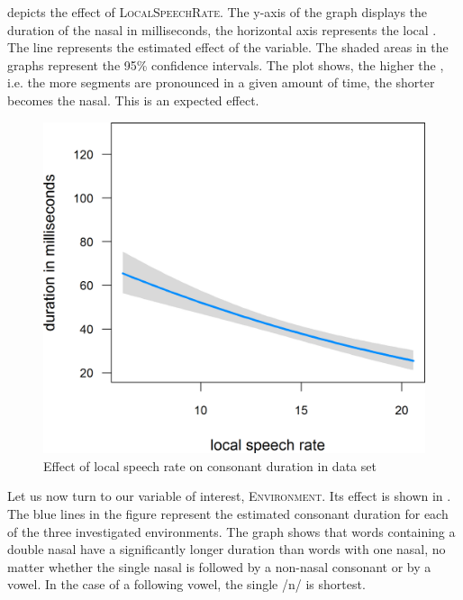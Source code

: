  depicts the effect of \textsc{LocalSpeechRate}.  The y-axis of the graph displays the duration of the nasal in milliseconds, the horizontal axis represents the local . The line represents the estimated effect of the variable. The shaded areas in the graphs represent the 95\% confidence intervals. The  plot shows, the higher the , i.e. the more segments are pronounced in a given amount of time, the shorter becomes the nasal. This is an expected effect.

\begin{figure}
	

	\includegraphics [scale=0.4]{images/Corpus/unModelSpeechRate.png}
	\caption{Effect of local speech rate on consonant duration in data set}
	\label{fig:SpeechRate un}

\end{figure}





Let us now turn to our variable of interest, \textsc{Environment}. Its effect is shown in . The blue lines in the figure represent the estimated consonant duration for each of the three investigated environments. The graph shows that words containing a double nasal have a significantly longer duration than words with one nasal, no matter whether the single nasal is followed by a non-nasal consonant or by a vowel. In the case of a following vowel, the single /n/ is shortest. 




